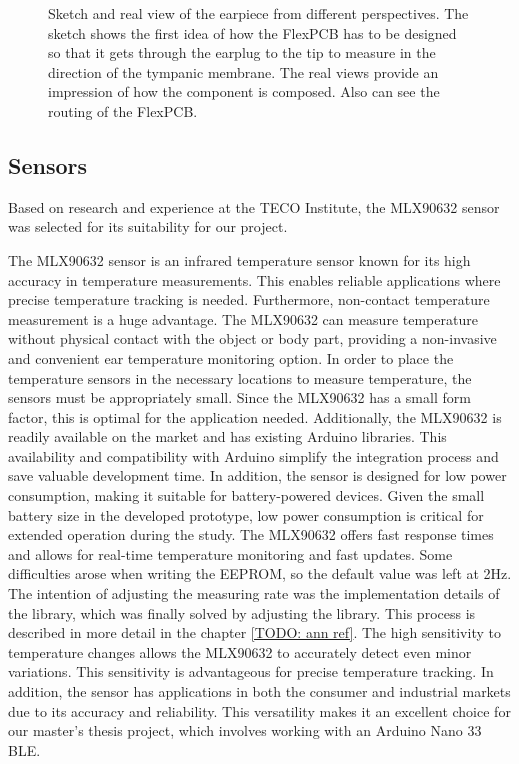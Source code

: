 \begin{figure}[!h]
    \caption{Sketch and real view of the earpiece from different perspectives.
The sketch shows the first idea of how the FlexPCB has to be designed so that it gets through the earplug to the tip to measure in the direction of the tympanic membrane. The real views provide an impression of how the component is composed. Also can see the routing of the FlexPCB.}
    \label{fig:design:prototype_earpiece_views}
\end{figure}

\subsection{Sensors}
\label{ch:Design:Prototype:Sensors}

Based on research and experience at the TECO Institute, the MLX90632 sensor was selected for its suitability for our project.

The MLX90632 sensor is an infrared temperature sensor known for its high accuracy in temperature measurements. This enables reliable applications where precise temperature tracking is needed.
Furthermore, non-contact temperature measurement is a huge advantage. 
The MLX90632 can measure temperature without physical contact with the object or body part, providing a non-invasive and convenient ear temperature monitoring option.
In order to place the temperature sensors in the necessary locations to measure temperature, the sensors must be appropriately small. 
Since the MLX90632 has a small form factor, this is optimal for the application needed.
Additionally, the MLX90632 is readily available on the market and has existing Arduino libraries. 
This availability and compatibility with Arduino simplify the integration process and save valuable development time.
In addition, the sensor is designed for low power consumption, making it suitable for battery-powered devices. 
Given the small battery size in the developed prototype, low power consumption is critical for extended operation during the study.
The MLX90632 offers fast response times and allows for real-time temperature monitoring and fast updates. 
Some difficulties arose when writing the EEPROM, so the default value was left at 2Hz.
The intention of adjusting the measuring rate was the implementation details of the library, which was finally solved by adjusting the library. 
This process is described in more detail in the chapter \ref{TODO: ann ref}.
The high sensitivity to temperature changes allows the MLX90632 to accurately detect even minor variations. This sensitivity is advantageous for precise temperature tracking.
In addition, the sensor has applications in both the consumer and industrial markets due to its accuracy and reliability. This versatility makes it an excellent choice for our master's thesis project, which involves working with an Arduino Nano 33 BLE.

